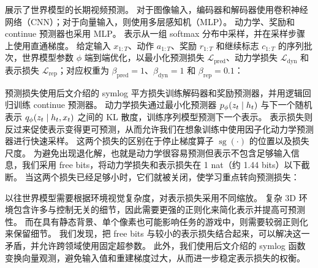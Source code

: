  展示了世界模型的长期视频预测。
对于图像输入，编码器和解码器使用卷积神经网络（CNN）；对于向量输入，则使用多层感知机（MLP）。
动力学、奖励和 continue 预测器也采用 MLP。
表示从一组 softmax 分布中采样，并在采样步骤上使用直通梯度\citep{bengio2013straight,hafner2020dreamerv2}。
给定输入 $x_{1:T}$、动作 $a_{1:T}$、奖励 $r_{1:T}$ 和继续标志 $c_{1:T}$ 的序列批次，世界模型参数 $\phi$ 端到端优化，以最小化预测损失 $\mathcal{L}_{\mathrm{pred}}$、动力学损失 $\mathcal{L}_{\mathrm{dyn}}$ 和表示损失 $\mathcal{L}_{\mathrm{rep}}$；对应权重为 $\beta_{\mathrm{pred}}=1$、$\beta_{\mathrm{dyn}}=1$ 和 $\beta_{\mathrm{rep}}=0.1$：



预测损失使用后文介绍的 symlog 平方损失训练解码器和奖励预测器，并用逻辑回归训练 continue 预测器。
动力学损失通过最小化预测器 $\pp(z_t|h_t)$ 与下一个随机表示 $\qp(z_t|h_t,x_t)$ 之间的 KL 散度，训练序列模型预测下一个表示。
表示损失则反过来促使表示变得更可预测，从而允许我们在想象训练中使用因子化动力学预测器进行快速采样。
这两个损失的区别在于停止梯度算子 $\operatorname{sg}(\cdot)$ 的位置以及损失尺度。
为避免出现退化解，也就是动力学很容易预测但表示不包含足够输入信息，我们采用 free bits\citep{kingma2016freebits}，将动力学损失和表示损失在 1 nat（约 1.44 bits）以下截断。
当这两个损失已经足够小时，它们就被关闭，使学习重点转向预测损失：


以往世界模型需要根据环境视觉复杂度，对表示损失采用不同缩放\citep{hafner2019dreamer}。
复杂 3D 环境包含许多与控制无关的细节，因此需要更强的正则化来简化表示并提高可预测性。
而在具有静态背景、单个像素也可能影响任务的游戏中，则需要较弱正则化来保留细节。
我们发现，把 free bits 与较小的表示损失结合起来，可以解决这一矛盾，并允许跨领域使用固定超参数。
此外，我们使用后文介绍的 symlog 函数变换向量观测，避免输入值和重建梯度过大，从而进一步稳定表示损失的权衡。

